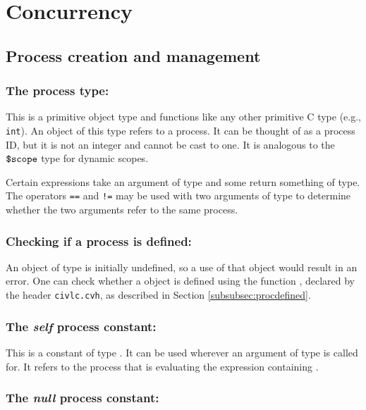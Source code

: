 \chapter{Concurrency}
\label{chap:concurrency}

\section{Process creation and management}

\subsection{The process type: \cproc}

This is a primitive object type and functions like any other primitive
C type (e.g., \texttt{int}). An object of this type refers to a
process. It can be thought of as a process ID, but it is not an
integer and cannot be cast to one.  It is analogous to the $\mbox{\texttt{\${}scope}}$
type for dynamic scopes.

Certain expressions take an argument of \cproc{} type and some return
something of \cproc{} type.  The operators \verb!==! and \verb~!=~ may
be used with two arguments of type \cproc{} to determine whether the
two arguments refer to the same process.

\subsection{Checking if a process is defined: \cprocdefined}

An object of type \cproc{} is initially undefined, so a use of that
object would result in an error.  One can check whether a \cproc{}
object is defined using the function \cprocdefined, declared by the header \texttt{civlc.cvh}, as 
described in Section \ref{subsubsec:procdefined}.

\subsection{The \emph{self} process constant: \cself}

This is a constant of type \cproc. It can be used wherever an argument
of type \cproc{} is called for. It refers to the process that is
evaluating the expression containing \cself.

\subsection{The \emph{null} process constant: \cprocNull}

